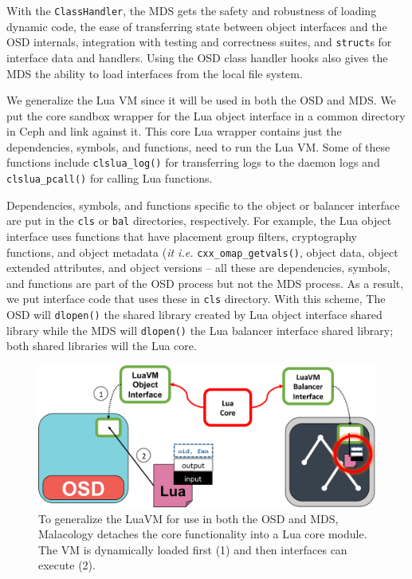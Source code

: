 \documentclass[10pt,twocolumn]{article}
\begin{document}
With the \texttt{ClassHandler}, the MDS gets the safety and robustness
of loading dynamic code, the ease of transferring state between object
interfaces and the OSD internals, integration with testing and
correctness suites, and \texttt{struct}s for interface data and
handlers. Using the OSD class handler hooks also gives the MDS the
ability to load interfaces from the local file system.

We generalize the Lua VM since it will be used in both the OSD and MDS.
We put the core sandbox wrapper for the Lua object interface in a common
directory in Ceph and link against it. This core Lua wrapper contains
just the dependencies, symbols, and functions, need to run the Lua VM.
Some of these functions include \texttt{clslua\_log()} for transferring
logs to the daemon logs and \texttt{clslua\_pcall()} for calling Lua
functions.

Dependencies, symbols, and functions specific to the object or balancer
interface are put in the \texttt{cls} or \texttt{bal} directories,
respectively. For example, the Lua object interface uses functions that
have placement group filters, cryptography functions, and object
metadata (\emph{it i.e.} \texttt{cxx\_omap\_getvals()}, object data,
object extended attributes, and object versions -- all these are
dependencies, symbols, and functions are part of the OSD process but not
the MDS process. As a result, we put interface code that uses these in
\texttt{cls} directory. With this scheme, The OSD will \texttt{dlopen()}
the shared library created by Lua object interface shared library while
the MDS will \texttt{dlopen()} the Lua balancer interface shared
library; both shared libraries will the Lua core.
\fi

\begin{figure}[htbp]
\centering
\includegraphics{figures/cls-osd-mds.png}
\caption{To generalize the LuaVM for use in both the OSD and MDS,
Malacology detaches the core functionality into a Lua core module. The
VM is dynamically loaded first (1) and then interfaces can execute (2).
\label{fig:cls-osd-mds}}
\end{figure}
\end{document}
